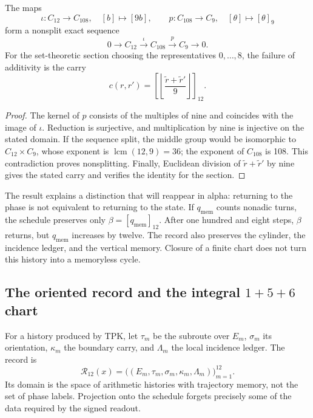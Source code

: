 \begin{proposition}
\label{prop:k-extension}
The maps
\[
 \iota:C_{12}\longrightarrow C_{108},\quad[b]\longmapsto[9b],
 \qquad p:C_{108}\longrightarrow C_9,\quad[\theta]\longmapsto[\theta]_9
\]
form a nonsplit exact sequence
\[
 0\longrightarrow C_{12}\xrightarrow{\iota}C_{108}
 \xrightarrow{p}C_9\longrightarrow0.
\]
For the set-theoretic section choosing the representatives
\(0,\ldots,8\), the failure of additivity is the carry
\[
 c(r,r')=\left[\left\lfloor\frac{\widetilde r+\widetilde r'}9\right\rfloor\right]_{12}.
\]
\end{proposition}

\begin{proof}
The kernel of \(p\) consists of the multiples of nine and coincides with
the image of \(\iota\). Reduction is surjective, and multiplication
by nine is injective on the stated domain. If the sequence
split, the middle group would be isomorphic to \(C_{12}\times C_9\), whose
exponent is \(\operatorname{lcm}(12,9)=36\); the exponent of
\(C_{108}\) is 108. This contradiction proves nonsplitting. Finally,
Euclidean division of \(\widetilde r+\widetilde r'\) by nine gives the
stated carry and verifies the identity for the section.
\end{proof}

The result explains a distinction that will reappear in alpha: returning to the
phase is not equivalent to returning to the state. If \(q_{\mathrm{mem}}\) counts
nonadic turns, the schedule preserves only
\(\beta=[q_{\mathrm{mem}}]_{12}\). After one hundred and eight steps,
\(\beta\) returns, but \(q_{\mathrm{mem}}\) increases by twelve. The
record also preserves the cylinder, the incidence ledger, and the vertical
memory. Closure of a finite chart does not turn this history into a
memoryless cycle.

\subsection{The oriented record and the integral \texorpdfstring{\(1+5+6\)}{1+5+6} chart}
\label{subsec:k-registro-integral}

For a history produced by TPK, let \(\tau_m\) be the subroute over
\(E_m\), \(\sigma_m\) its orientation, \(\kappa_m\) the boundary
carry, and \(\Lambda_m\) the local incidence ledger. The record is
\[
 \mathcal R_{12}(x)=
 \bigl((E_m,\tau_m,\sigma_m,\kappa_m,\Lambda_m)\bigr)_{m=1}^{12}.
\]
Its domain is the space of arithmetic histories with trajectory memory, not the set of
phase labels. Projection onto the schedule forgets precisely some
of the data required by the signed readout.

